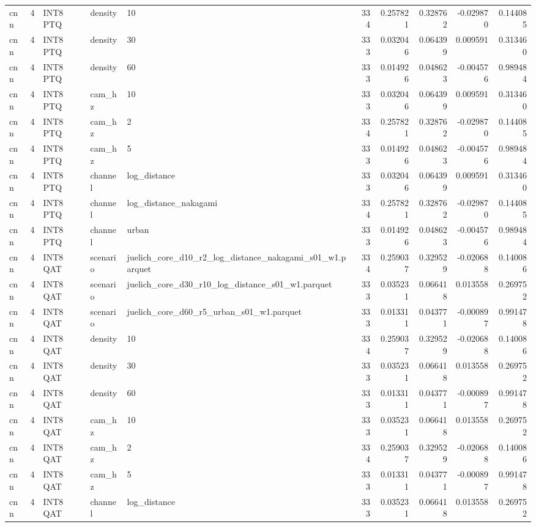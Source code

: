 \begin{tabular}{lrlllrrrrr}
cnn & 4 & INT8 PTQ & density & 10 & 334 & 0.257821 & 0.328762 & -0.029870 & 0.144085 \\
cnn & 4 & INT8 PTQ & density & 30 & 333 & 0.032046 & 0.064399 & 0.009591 & 0.313460 \\
cnn & 4 & INT8 PTQ & density & 60 & 333 & 0.014926 & 0.048623 & -0.004576 & 0.989484 \\
cnn & 4 & INT8 PTQ & cam\_hz & 10 & 333 & 0.032046 & 0.064399 & 0.009591 & 0.313460 \\
cnn & 4 & INT8 PTQ & cam\_hz & 2 & 334 & 0.257821 & 0.328762 & -0.029870 & 0.144085 \\
cnn & 4 & INT8 PTQ & cam\_hz & 5 & 333 & 0.014926 & 0.048623 & -0.004576 & 0.989484 \\
cnn & 4 & INT8 PTQ & channel & log\_distance & 333 & 0.032046 & 0.064399 & 0.009591 & 0.313460 \\
cnn & 4 & INT8 PTQ & channel & log\_distance\_nakagami & 334 & 0.257821 & 0.328762 & -0.029870 & 0.144085 \\
cnn & 4 & INT8 PTQ & channel & urban & 333 & 0.014926 & 0.048623 & -0.004576 & 0.989484 \\
cnn & 4 & INT8 QAT & scenario & juelich\_core\_d10\_r2\_log\_distance\_nakagami\_s01\_w1.parquet & 334 & 0.259037 & 0.329529 & -0.020688 & 0.140086 \\
cnn & 4 & INT8 QAT & scenario & juelich\_core\_d30\_r10\_log\_distance\_s01\_w1.parquet & 333 & 0.035231 & 0.066418 & 0.013558 & 0.269752 \\
cnn & 4 & INT8 QAT & scenario & juelich\_core\_d60\_r5\_urban\_s01\_w1.parquet & 333 & 0.013311 & 0.043771 & -0.000897 & 0.991478 \\
cnn & 4 & INT8 QAT & density & 10 & 334 & 0.259037 & 0.329529 & -0.020688 & 0.140086 \\
cnn & 4 & INT8 QAT & density & 30 & 333 & 0.035231 & 0.066418 & 0.013558 & 0.269752 \\
cnn & 4 & INT8 QAT & density & 60 & 333 & 0.013311 & 0.043771 & -0.000897 & 0.991478 \\
cnn & 4 & INT8 QAT & cam\_hz & 10 & 333 & 0.035231 & 0.066418 & 0.013558 & 0.269752 \\
cnn & 4 & INT8 QAT & cam\_hz & 2 & 334 & 0.259037 & 0.329529 & -0.020688 & 0.140086 \\
cnn & 4 & INT8 QAT & cam\_hz & 5 & 333 & 0.013311 & 0.043771 & -0.000897 & 0.991478 \\
cnn & 4 & INT8 QAT & channel & log\_distance & 333 & 0.035231 & 0.066418 & 0.013558 & 0.269752 \\

\end{tabular}
